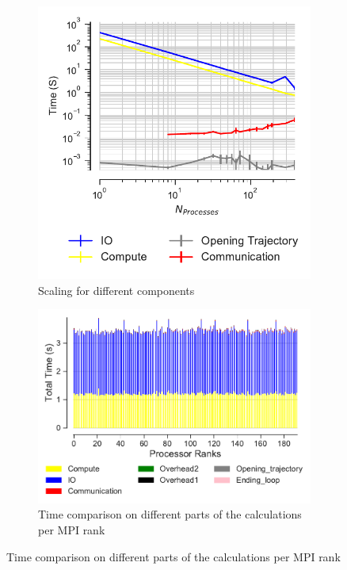 \begin{figure}[ht!]
\begin{subfigure}{.4\textwidth}
\centering
  \includegraphics[width=\linewidth]{figures/hdf5-time_comp_IO_comparison.pdf}
\caption{Scaling for different components}
\label{fig:ScalingComputeIO-hdf5}
\end{subfigure}
\hfill
\begin{subfigure} {.5\textwidth}
  \includegraphics[width=\linewidth]{figures/hdf5-BarPlot-rank-comparison_192_4.pdf}
  \caption{Time comparison on different parts of the calculations per MPI rank}

\end{subfigure}
\end{figure}
